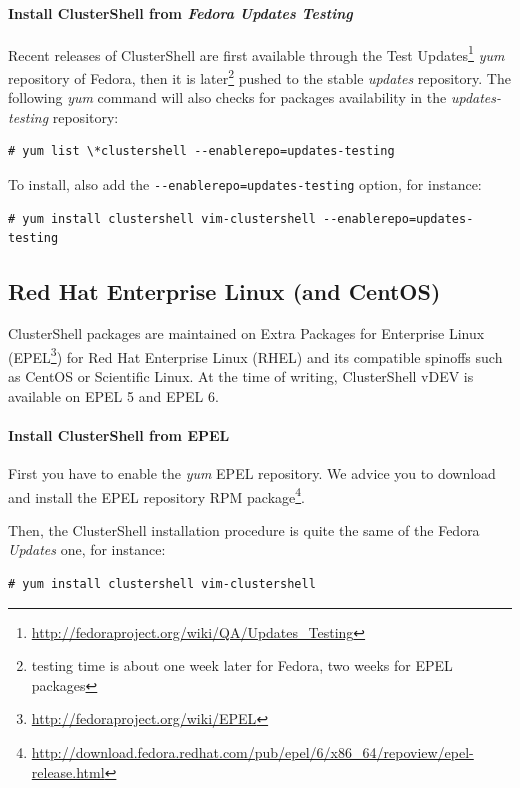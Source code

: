 \documentclass[english,a4paper]{csuserguide}
\providecommand{\version}{DEV}%
\begin{document}
\paragraph{Install ClusterShell from \textit{Fedora Updates Testing}}

Recent releases of ClusterShell are first available through the Test Updates\footnote{\url{http://fedoraproject.org/wiki/QA/Updates_Testing}} \textit{yum} repository of Fedora, then it is later\footnote{testing time is about one week later for Fedora, two weeks for EPEL packages} pushed to the stable \textit{updates} repository. The following \textit{yum} command will also checks for packages availability in the \textit{updates-testing} repository:

\begin{verbatim}
# yum list \*clustershell --enablerepo=updates-testing
\end{verbatim}

To install, also add the \verb+--enablerepo=updates-testing+ option, for instance:
\begin{verbatim}
# yum install clustershell vim-clustershell --enablerepo=updates-testing
\end{verbatim}

\subsection{Red Hat Enterprise Linux (and CentOS)}

ClusterShell packages are maintained on Extra Packages for Enterprise Linux (EPEL\footnote{\url{http://fedoraproject.org/wiki/EPEL}}) for Red Hat Enterprise Linux (RHEL) and its compatible spinoffs such as CentOS or Scientific Linux. At the time of writing, ClusterShell v\version{} is available on EPEL 5 and EPEL 6.


\paragraph{Install ClusterShell from EPEL}

First you have to enable the \textit{yum} EPEL repository. We advice you to download and install the EPEL repository RPM package\footnote{\url{http://download.fedora.redhat.com/pub/epel/6/x86_64/repoview/epel-release.html}}.

Then, the ClusterShell installation procedure is quite the same of the Fedora \textit{Updates} one, for instance:

\begin{verbatim}
# yum install clustershell vim-clustershell
\end{verbatim}
\end{document}
